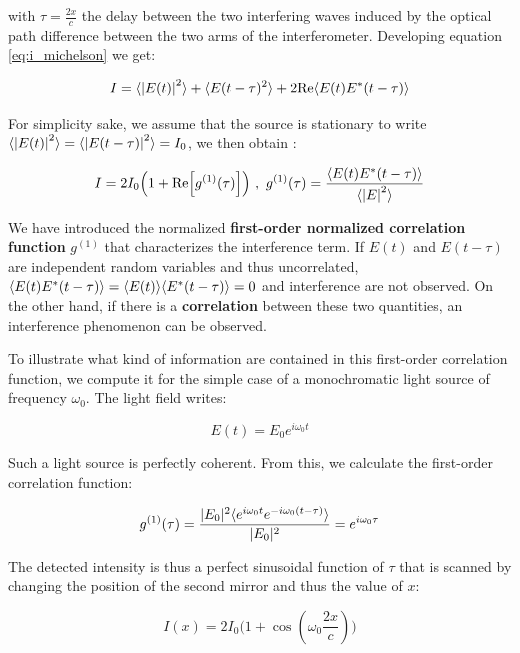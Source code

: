 \noindent with $\tau=\frac{2x}{c}$ the delay between the two interfering waves induced by the optical path difference between the two arms of the interferometer. Developing equation \ref{eq:i_michelson} we get:

\begin{equation}
    I=\langle\left\lvert E(t)\right\rvert^2\rangle  + \langle E(t-\tau)^2\rangle + 2 {\rm{Re}} \langle E(t) E^*(t-\tau)\rangle
    \label{eq:def_g1}
\end{equation}

For simplicity sake, we assume that the source is stationary to write $\langle\left\lvert E(t)\right\rvert^2\rangle = \langle\left\lvert E(t-\tau)\right\rvert^2\rangle = I_0$, we then obtain :

\begin{equation}
    I= 2 I_0 \Big(1 + {\rm{Re}} \Big[g^{(1)} (\tau) \Big] \Big) \ , \ g^{(1)} (\tau) = \frac{ \langle E(t) E^*(t-\tau)\rangle}{\langle\left\lvert E\right\rvert^2\rangle}
\end{equation}

\noindent We have introduced the normalized \textbf{first-order normalized correlation function} $g^{(1)}$ that characterizes the interference term. If $E(t)$ and $E(t-\tau)$ are independent random variables and thus uncorrelated, $\langle E(t) E^*(t-\tau)\rangle = \langle E(t)\rangle \langle E^*(t-\tau)\rangle=0$ and interference are not observed. On the other hand, if there is a \textbf{correlation} between these two quantities, an interference phenomenon can be observed. 

To illustrate what kind of information are contained in this first-order correlation function, we compute it for the simple case of a monochromatic light source of frequency $\omega_0$. The light field writes:

\begin{equation}
    E(t)=E_0 e^{i \omega_0 t}
\end{equation}

\noindent Such a light source is perfectly coherent. From this, we calculate the first-order correlation function:

\begin{equation}
    g^{(1)} (\tau) = \frac{|E_0|^2 \langle e^{i\omega_0 t} e^{-i \omega_0 (t-\tau)}\rangle}{|E_0|^2} = e^{i \omega_0 \tau}
\end{equation}

\noindent The detected intensity is thus a perfect sinusoidal function of $\tau$ that is scanned by changing the position of the second mirror and thus the value of $x$:

\begin{equation}
I(x)= 2 I_0 \Big(1+\cos(\omega_0 \frac{2x}{c}) \Big)
\end{equation}

